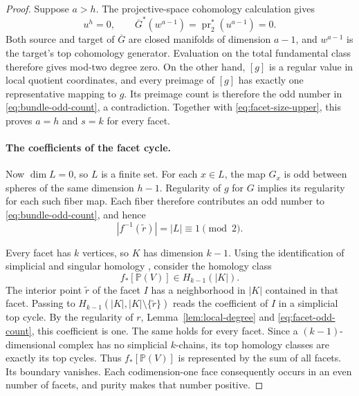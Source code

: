 \begin{proof}
Suppose $a>h$.  The projective-space cohomology calculation
\cite[Theorem~3.19]{Hatcher2002} gives
\[
 u^h=0,\qquad
 \overline G^*(w^{a-1})=
       \operatorname{pr}_2^*(u^{a-1})=0.
\]
Both source and target of $\overline G$ are closed manifolds of
dimension $a-1$, and $w^{a-1}$ is the target's top cohomology
generator.  Evaluation on the total fundamental class therefore
gives mod-two degree zero.  On the other hand, $[g]$ is a regular
value in local quotient coordinates, and every preimage of $[g]$
has exactly one representative mapping to $g$.  Its preimage count
is therefore the odd number in \eqref{eq:bundle-odd-count}, a
contradiction.  Together with \eqref{eq:facet-size-upper}, this
proves $a=h$ and $s=k$ for every facet.

\paragraph{The coefficients of the facet cycle.}
Now $\dim L=0$, so $L$ is a finite set.  For each $x\in L$, the
map $G_x$ is odd between spheres of the same dimension $h-1$.
Regularity of $g$ for $G$ implies its regularity for each such
fiber map.  Each fiber therefore contributes an odd number to
\eqref{eq:bundle-odd-count}, and hence
\begin{equation}\label{eq:facet-odd-count}
 |f^{-1}(\widetilde r)|=|L|\equiv1\pmod2.
\end{equation}

Every facet has $k$ vertices, so $K$ has dimension $k-1$.
Using the identification of simplicial and singular homology
\cite[Theorem~2.27]{Hatcher2002}, consider the homology class
\[
 f_*[\mathbb P(V)]\in H_{k-1}(|K|).
\]
The interior point $\widetilde r$ of the facet $I$ has a
neighborhood in $|K|$ contained in that facet.  Passing to
$H_{k-1}(|K|,|K|\setminus\{\widetilde r\})$ reads the coefficient
of $I$ in a simplicial top cycle.  By the regularity of $r$,
Lemma~\ref{lem:local-degree} and \eqref{eq:facet-odd-count}, this
coefficient is one.  The same holds for every facet.  Since a
$(k-1)$-dimensional complex has no simplicial $k$-chains, its
top homology classes are exactly its top cycles.  Thus
$f_*[\mathbb P(V)]$ is represented by the sum of all facets.
Its boundary vanishes.  Each codimension-one face consequently
occurs in an even number of facets, and purity makes that number
positive.
\end{proof}
